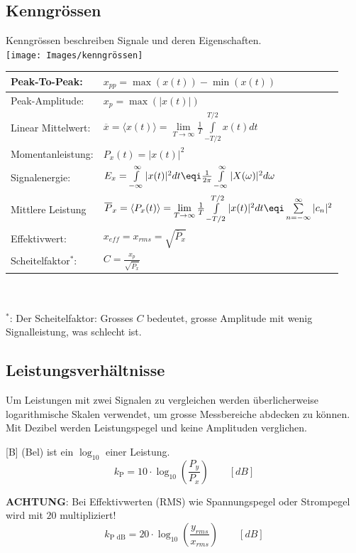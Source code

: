 \subsection{Kenngrössen} 
 Kenngrössen beschreiben Signale und deren Eigenschaften.\\
\texttt{[image: Images/kenngrössen]}

\begin{tabular}{m{3cm} m{5cm}}
		Peak-To-Peak: & $x_{pp} = \max(x(t)) - \min(x(t))$ \\ \midrule
		Peak-Amplitude: & $x_p = \max(|x(t)|)$ \\\midrule
		Linear Mittelwert: & $\overline{x} = \langle x(t)\rangle = \lim\limits_{T\rightarrow\infty}\frac{1}{T}\int\limits_{-T/2}^{T/2}x(t)dt$ \\\midrule
		Momentanleistung: & $P_x(t) = |x(t)|^2$ \\\midrule
		Signalenergie: & $E_x = \int\limits_{-\infty}^{\infty}|x(t)|^2 dt \eqi \frac{1}{2\pi}\int\limits_{-\infty}^{\infty}|X(\omega)|^2d\omega$ \\\midrule
		Mittlere Leistung & $\overline{P}_x = \langle P_x(t)\rangle = \lim\limits_{T\rightarrow\infty}\frac{1}{T}\int\limits_{-T/2}^{T/2}|x(t)|^2dt \eqi \sum\limits_{n=-\infty}^{\infty}|c_n|^2$  \\\midrule
		Effektivwert: & $x_{eff} = x_{rms} = \sqrt{\overline{P}_x}$ \\\midrule
		Scheitelfaktor$^*$: & $C = \frac{x_p}{\sqrt{\overline{P}_x}}$
\end{tabular}
~\\ \\
$^*$: Der Scheitelfaktor: Grosses $C$ bedeutet, grosse Amplitude mit wenig Signalleistung, was schlecht ist.


\subsection{Leistungsverhältnisse}
Um Leistungen mit zwei Signalen zu vergleichen werden überlicherweise logarithmische Skalen verwendet, um grosse Messbereiche abdecken zu können. Mit Dezibel werden Leistungspegel und keine Amplituden verglichen.

[B] (Bel) ist ein $\log_{10}$ einer Leistung.
\[k_{\text{P}} = 10 \cdot \log_{10}\left(\frac{P_y}{P_x}\right) \qquad [dB]\]

\textbf{ACHTUNG}: Bei Effektivwerten (RMS) wie Spannungspegel oder Strompegel wird mit $20$ multipliziert!
\[k_{\text{P dB}} = 20 \cdot \log_{10}\left(\frac{y_{rms}}{x_{rms}}\right) \qquad [dB]\]

